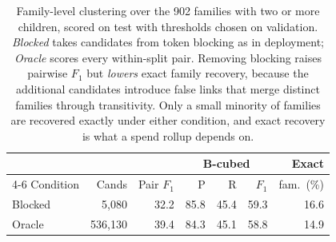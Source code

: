 \begin{table}[t]
\centering
\footnotesize
\setlength{\tabcolsep}{4pt}
\begin{tabular}{lrrrrrr}
\toprule
& & & \multicolumn{3}{c}{B-cubed} & Exact \\
\cmidrule(lr){4-6}
Condition & Cands & Pair $F_1$ & P & R & $F_1$ & fam.\ (\%) \\
\midrule
Blocked & 5,080 & 32.2 & 85.8 & 45.4 & 59.3 & 16.6 \\
Oracle & 536,130 & 39.4 & 84.3 & 45.1 & 58.8 & 14.9 \\
\bottomrule
\end{tabular}
\caption{Family-level clustering over the 902 families with
two or more children, scored on test with thresholds chosen on validation.
\emph{Blocked} takes candidates from token blocking as in deployment;
\emph{Oracle} scores every within-split pair. Removing blocking raises pairwise
$F_1$ but \emph{lowers} exact family recovery, because the additional candidates
introduce false links that merge distinct families through transitivity. Only a small
minority of families are recovered exactly under either condition, and exact recovery
is what a spend rollup depends on.}
\label{tab:clustering}
\end{table}
